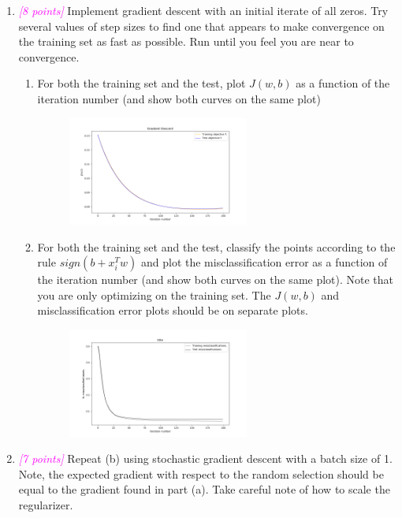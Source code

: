\documentclass{article}
\newcommand{\1}{\mathbf{1}}
\newcommand{\points}[1]{\small\textcolor{magenta}{\emph{[#1 points]}} \normalsize}
\begin{document}
\begin{enumerate}
    
    \newpage
    \item \points{8} Implement gradient descent with an initial iterate of all zeros. Try several values of step sizes to find one that appears to make convergence on the training set as fast as possible. Run until you feel you are near to convergence.
    \begin{enumerate}
        \item For both the training set and the test, plot $J(w,b)$ as a function of the iteration number (and show both curves on the same plot) \\
        \begin{figure}[h!]
        \centering
            \includegraphics[width=0.6\textwidth]{HW2/HW2_plots/JwbA6b.png}
        \end{figure}
        \item For both the training set and the test, classify the points according to the rule $sign(b+x^T_iw)$ and plot the misclassification error as a function of the iteration number (and show both curves on the same plot). Note that you are only optimizing on the training set. The $J(w,b)$ and misclassification error plots should be on separate plots.
        \begin{figure}[h!]
        \centering
            \includegraphics[width=0.6\textwidth]{HW2/HW2_plots/missclassificationsA6b.png}
        \end{figure}
    \end{enumerate}
    
    \newpage
    \item \points{7} Repeat (b) using stochastic gradient descent with a batch size of 1. Note, the expected gradient with respect to the random selection should be equal to the gradient found in part (a). Take careful note of how to scale the regularizer.
    

\end{enumerate}
\end{document}
